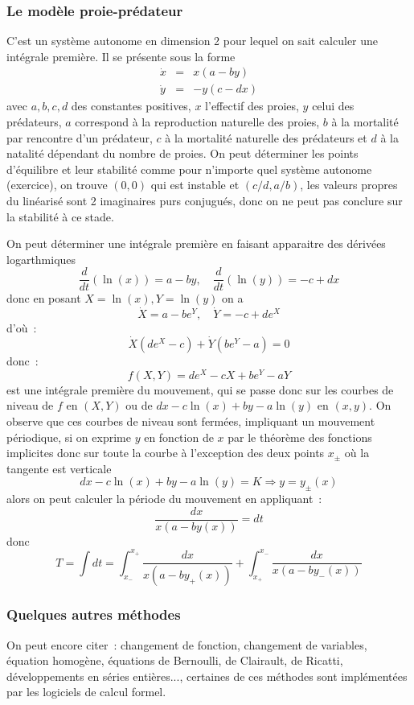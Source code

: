 \documentclass[a4paper,11pt]{article}
\begin{document}
\begin{giacjshere}
\subsubsection{Le mod\`ele proie-pr\'edateur}
C'est un syst\`eme autonome en dimension 2 pour lequel on sait
calculer une int\'egrale premi\`ere. Il se pr\'esente sous la forme
\begin{eqnarray*}
\dot{x}&=&x(a-by)\\
\dot{y}&=&-y(c-dx)
\end{eqnarray*}
avec $a,b,c,d$ des constantes positives, $x$ l'effectif des proies,
$y$ celui des pr\'edateurs,
$a$ correspond \`a la reproduction naturelle des proies, 
$b$ \`a la mortalit\'e par
rencontre d'un pr\'edateur, $c$ \`a la mortalit\'e naturelle
des pr\'edateurs et $d$ \`a la natalit\'e d\'ependant du nombre de
proies.
On peut d\'eterminer les points d'\'equilibre et leur stabilit\'e
comme pour n'importe quel syst\`eme autonome (exercice),
on trouve $(0,0)$  qui est instable et $(c/d,a/b)$, les valeurs propres
du lin\'earis\'e 
sont 2 imaginaires purs conjugu\'es, donc on ne peut pas conclure sur
la stabilit\'e \`a ce stade.

On peut d\'eterminer une int\'egrale premi\`ere en faisant apparaitre
des d\'eriv\'ees logarthmiques
$$ \frac{d}{dt}(\ln(x))=a-by, \quad \frac{d}{dt}(\ln(y))=-c+dx $$
donc en posant $X=\ln(x), Y=\ln(y)$ on a
$$ \dot{X}=a-be^Y, \quad \dot{Y}=-c+de^X$$
d'o\`u~:
$$ \dot{X} (de^X-c) + \dot{Y}(be^Y-a)=0$$
donc~:
$$ f(X,Y)=de^X-cX+be^Y-aY$$
est une int\'egrale premi\`ere du mouvement, qui se passe donc sur
les courbes de niveau de $f$ en $(X,Y)$ ou de $dx-c\ln(x)+by-a\ln(y)$
en $(x,y)$. On observe que ces courbes de niveau sont ferm\'ees, 
impliquant un mouvement p\'eriodique, si on exprime $y$ en fonction
de $x$ par le th\'eor\`eme des fonctions implicites donc sur toute la
courbe \`a l'exception des deux points $x_\pm$ o\`u la tangente est verticale
$$dx-c\ln(x)+by-a\ln(y)=K \Rightarrow y=y_{\pm}(x)$$
alors on peut calculer la p\'eriode du mouvement en appliquant~:
$$ \frac{dx}{x(a-by(x))}=dt$$
donc
$$ T=\int dt = \int_{x_-}^{x_+}  \frac{dx}{x(a-by_+(x))}
+ \int_{x_+}^{x_-}  \frac{dx}{x(a-by_-(x))}
$$

\subsubsection{Quelques autres m\'ethodes}
On peut encore citer~: 
changement de fonction, changement de variables, 
\'equation homog\`ene, \'equations de Bernoulli,
de Clairault, de Ricatti, d\'eveloppements en s\'eries
enti\`eres..., certaines de ces m\'ethodes sont
impl\'ement\'ees par les logiciels de calcul formel.


\end{giacjshere}
\end{document}

